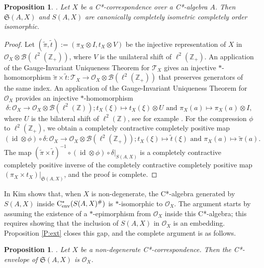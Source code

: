 \documentclass[11pt, draft]{amsart}
\numberwithin{equation}{section}
\theoremstyle{plain}
\newtheorem{proposition}[theorem]{Proposition}
\theoremstyle{definition}
\theoremstyle{remark}
\newcommand{\B}{{\mathcal{B}}}
\renewcommand{\O}{{\mathcal{O}}}
\newcommand{\T}{{\mathcal{T}}}
\def\de{\delta}
\newcommand{\bZ}{\mathbb{Z}}
\newcommand{\fS}{{\mathfrak{S}}}
\newcommand{\cenv}{\mathrm{C}^*_{\textup{env}}}
\newcommand{\wt}{\widetilde}
\newcommand{\id}{{\operatorname{id}}}
\begin{document}
\begin{proposition}\label{P:S is fS} \cite[Proposition 2.5]{Kim21}.
Let $X$ be a C*-correspondence over a C*-algebra $A$. 
Then $\fS(A,X)$ and $S(A,X)$ are canonically completely isometric completely order isomorphic. 
\end{proposition}

\begin{proof}
Let $(\wt{\pi},\wt{t}) := (\pi_X \otimes I, t_X \otimes V)$ be the injective representation of $X$ in $\O_X\otimes \B(\ell^2(\bZ_+))$, where $V$ is the unilateral shift of $\ell^2(\bZ_+)$. 
An application of the Gauge-Invariant Uniqueness Theorem for $\T_X$ gives an injective $*$-homomorphism $\wt{\pi}\times\wt{t} \colon \T_X \to \O_X\otimes \B(\ell^2(\bZ_+))$ that preserves generators of the same index.
An application of the Gauge-Invariant Uniqueness Theorem for $\O_X$ provides an injective $*$-homomorphism 
\[
\de \colon \O_X\to \O_X\otimes \B(\ell^2(\bZ)); t_X(\xi) \mapsto t_X(\xi)\otimes U\text{ and } \pi_X(a)\mapsto \pi_X(a)\otimes I,
\]
where $U$ is the bilateral shift of $\ell^2(\bZ)$, see for example \cite[Remark 2.2 (4)]{LPRS87}. 
For the compression $\phi$ to $\ell^2(\bZ_+)$, we obtain a completely contractive completely positive map 
\[
(\id \otimes \phi) \circ \de \colon \O_X\to \O_X\otimes \B(\ell^2(\bZ_+)); t_X(\xi) \mapsto \wt{t}(\xi)\text{ and } \pi_X(a)\mapsto \wt{\pi}(a).
\]
The map $(\wt{\pi}\times\wt{t})^{-1} \circ (\id \otimes \phi) \circ \de |_{S(A,X)}$ is a completely contractive completely positive inverse of the completely contractive completely positive map $(\pi_X\times t_X)|_{\fS(A,X)}$, and the proof is complete.
\end{proof}

In \cite[Proposition 2.6]{Kim21} Kim shows that, when $X$ is non-degenerate, the C*-algebra generated by $S(A,X)$ inside $\cenv(S(A,X)^\#)$ is $*$-isomorphic to $\O_X$.
The argument starts by assuming the existence of a $*$-epimorphism from $\O_X$ inside this C*-algebra; this requires showing that the inclusion of $S(A,X)$ in $\O_X$ is an embedding.
Proposition \ref{P:ext} closes this gap, and the complete argument is as follows.

\begin{proposition}\label{P:cenv S(A,X)} \cite[Proposition 2.6]{Kim21}. 
Let $X$ be a non-degenerate C*-correspondence. 
Then the C*-envelope of $\fS(A,X)$ is $\O_X$.
\end{proposition}
\end{document}
